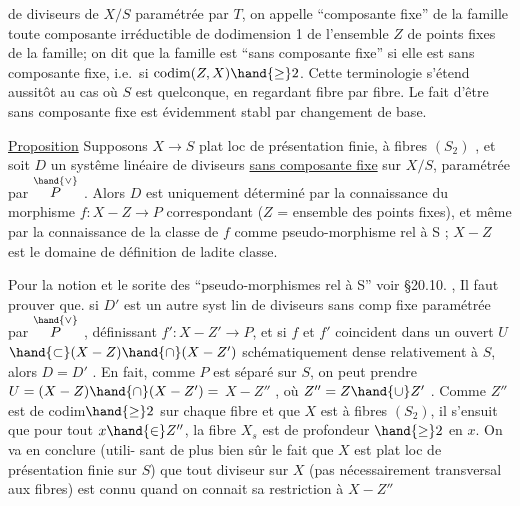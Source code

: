 
de diviseurs de $X/S$ paramétrée par $T$, on appelle ``composante fixe'' de la
famille toute composante irréductible de dodimension 1 de l'ensemble $Z$ de
points fixes de la famille; on dit que la famille est ``sans composante
fixe'' si elle est sans composante fixe, i.e.\ si $\operatorname{codim}(Z,X) \hand{\geq} 2$. Cette
terminologie s'étend aussitôt au cas où $S$ est quelconque, en regardant
fibre par fibre. Le fait d'être sans composante fixe est évidemment stabl
par changement de base.

\uline{Proposition} \hand{/}Supposons $X \longrightarrow S$ plat loc de présentation finie, à fibres
$(S_2)$ , et soit $D$ un systême linéaire de diviseurs \uline{sans composante fixe}
sur $X/S$, paramétrée par $\overset{\hand{\vee}}{P}$ . Alors $D$ est uniquement déterminé par la
connaissance du morphisme $f: X - Z \longrightarrow P$ correspondant ($Z$ = ensemble
des points fixes), et même par la connaissance de la classe de $f$ comme
pseudo-morphisme rel à S ; $X-Z$ est le domaine
de définition de ladite classe.

Pour la notion et le sorite des ``pseudo-morphismes
rel à S'' voir \S 20.10. ,  Il faut prouver que.
si  $D'$ est un
autre syst lin de diviseurs sans comp fixe paramétrée par $\overset{\hand{\vee}}{P}$ , 
définissant $f': X-Z' \longrightarrow P$, et si $f$ et $f'$ coincident dans un ouvert $U$
$\hand{\subset} (X-Z)\hand{\cap}(X-Z')$ schématiquement dense relativement à $S$, alors $D=D'$ .
En fait, comme $P$ est séparé sur $S$, on peut prendre $U=(X-Z)\hand{\cap}(X-Z') =$
 $X-Z''$ , où $Z'' = Z\hand{\cup}Z'$ . Comme $Z''$ est de codim$\hand{\geq}2$
sur chaque fibre et que $X$ est à fibres $(S_2)$, il s'ensuit que pour tout
$x\hand{\in} Z''$, la fibre $X_s$ est de profondeur $\hand{\geq}2$ en $x$. On va en conclure (utili-%
sant de plus bien sûr le fait que $X$ est plat loc de présentation finie
sur $S$) que tout diviseur  sur $X$ (pas nécessairement 
transversal aux fibres) est connu quand on connait sa restriction à $X-Z''$

